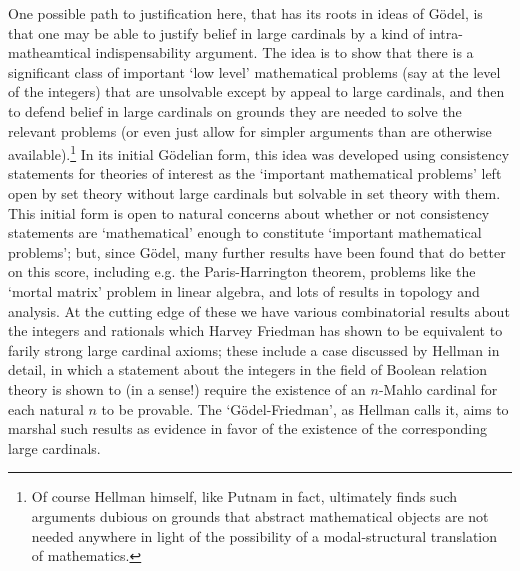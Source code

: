 \documentclass{amsart}
\theoremstyle{definition}
\begin{document}
One possible path to justification here, that has its roots in ideas of G\"odel, 
is that one may be able to justify belief in large cardinals by 
a kind of intra-matheamtical indispensability argument. The idea is to show that there
is a significant class of important `low level' mathematical problems 
(say at the level of the integers) that are unsolvable except
by appeal to large cardinals, and then to defend belief in large cardinals 
on grounds they are needed to solve the relevant problems (or even just 
allow for simpler arguments than are otherwise available).\footnote{
    Of course Hellman himself, like Putnam in fact, 
    ultimately finds such arguments dubious on grounds 
    that abstract mathematical objects are not needed anywhere
    in light of the possibility of a modal-structural translation 
    of mathematics.
} 
In its initial G\"odelian form, this idea was developed using consistency statements 
for theories of interest as the `important mathematical problems' left open by set theory
without large cardinals but solvable in set theory with them. This initial form is 
open to natural concerns about whether or not consistency statements are `mathematical'
enough to constitute `important mathematical problems'; but, since G\"odel,
many further results have been found that do better on this score, including e.g. the 
Paris-Harrington theorem, problems like the `mortal matrix' problem in linear algebra,
and lots of results in topology and analysis. At the 
cutting edge of these we have various combinatorial results about the integers and rationals
which Harvey Friedman has shown to be equivalent to farily strong large cardinal 
axioms; these include a case discussed by Hellman in detail, 
in which a statement about the integers in the field of Boolean relation theory 
is shown to (in a sense!) require the existence 
of an $n$-Mahlo cardinal for each natural $n$ to be provable.
The `G\"odel-Friedman', as Hellman 
calls it, aims to marshal such results as evidence in favor of the existence 
of the corresponding large cardinals.
\end{document}
